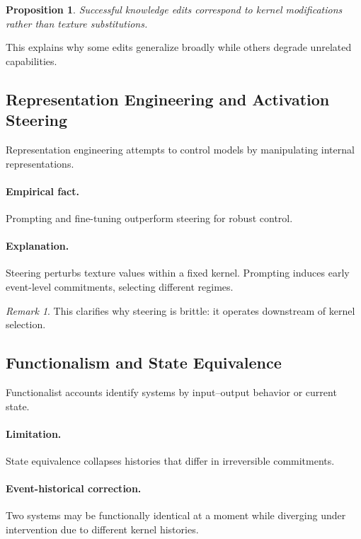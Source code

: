 \documentclass[11pt]{article}
\newtheorem{proposition}{Proposition}
\theoremstyle{remark}
\newtheorem{remark}{Remark}
\begin{document}
\begin{proposition}
Successful knowledge edits correspond to kernel modifications rather
than texture substitutions.
\end{proposition}

This explains why some edits generalize broadly while others degrade
unrelated capabilities.

\subsection{Representation Engineering and Activation Steering}

Representation engineering attempts to control models by manipulating
internal representations.

\paragraph{Empirical fact.}
Prompting and fine-tuning outperform steering for robust control.

\paragraph{Explanation.}
Steering perturbs texture values within a fixed kernel. Prompting
induces early event-level commitments, selecting different regimes.

\begin{remark}
This clarifies why steering is brittle: it operates downstream of
kernel selection.
\end{remark}

\subsection{Functionalism and State Equivalence}

Functionalist accounts identify systems by input–output behavior or
current state.

\paragraph{Limitation.}
State equivalence collapses histories that differ in irreversible
commitments.

\paragraph{Event-historical correction.}
Two systems may be functionally identical at a moment while diverging
under intervention due to different kernel histories.
\end{document}
